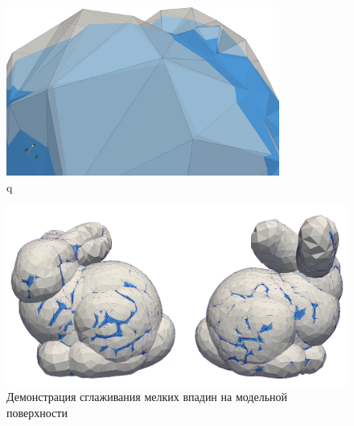 \begin{figure}[ht]
	\centering
	\includegraphics[width=0.80\textwidth]{./pics/text_1_remesh_common_envelope/pic_envelope_peak.png}
	\caption{q}
	\label{fig:text_1_remesh_common_envelope_6}
\end{figure}

\begin{figure}[ht]
	\centering
	\includegraphics[width=1.0\textwidth]{./pics/text_1_remesh_common_envelope/bunny.png}
	\caption{Демонстрация сглаживания мелких впадин на модельной поверхности}
	\label{fig:text_1_remesh_common_envelope_7}
\end{figure}
